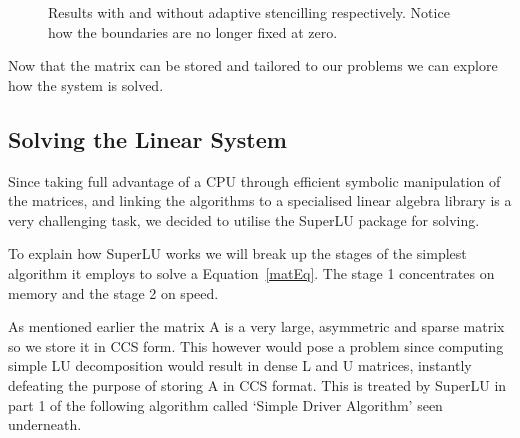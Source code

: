 \documentclass[a4paper]{article}
\begin{document}
\begin{figure}[!h]
  \centering
{}\hfill
{}
  \caption{Results with and without adaptive stencilling respectively. Notice 
how the boundaries are no longer fixed at zero.}
\end{figure}
\pagebreak
Now that the matrix can be stored and tailored to our problems we can explore
how the system is solved.

\subsection{Solving the Linear System}
Since taking full advantage of a CPU through efficient symbolic manipulation of
the matrices, and linking the algorithms to a specialised linear algebra
library is a very challenging task, we decided to utilise the SuperLU package
for solving.

To explain how SuperLU works we will break up the stages of the simplest
algorithm it employs to solve a Equation~\eqref{matEq}. The stage 1
concentrates on memory and the stage 2 on speed.

As mentioned earlier the matrix A is a very large, asymmetric and sparse  
matrix so we store it in CCS form. This however would pose a problem since 
computing simple LU decomposition would result in dense L and U matrices, 
instantly defeating the purpose of storing A in CCS format. This is treated by 
SuperLU in part 1 of the following algorithm called `Simple Driver Algorithm'
seen underneath.
\end{document}
